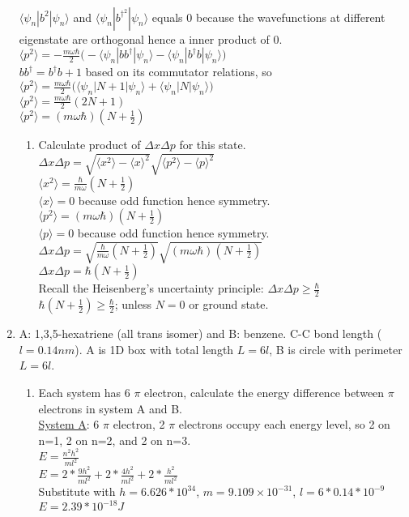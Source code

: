 \documentclass{article}
\begin{document}
\begin{enumerate}
    \\ $\langle\psi_n|b^2|\psi_n\rangle$ and $\langle\psi_n|b^\dagger^2|\psi_n\rangle$ equals 0 because the wavefunctions at different eigenstate are orthogonal hence a inner product of 0.
    \\ $\langle p^2\rangle=-\frac{m\omega\hbar}{2}\Big(-\langle\psi_n|bb^\dagger|\psi_n\rangle -\langle\psi_n|b^\dagger b|\psi_n\rangle\Big)$
    \\ $bb^\dagger = b^\dagger b +1$ based on its commutator relations, so
    \\ $\langle p^2\rangle=\frac{m\omega\hbar}{2}\Big(\langle\psi_n|N+1|\psi_n\rangle +\langle\psi_n|N|\psi_n\rangle\Big)$
    \\ $\langle p^2\rangle=\frac{m\omega\hbar}{2}(2N+1)$
    \\ $\langle p^2\rangle=(m\omega\hbar)(N+\frac{1}{2})$ 
    \begin{enumerate}
    \item Calculate product of $\Delta x\Delta p$ for this state. 
    \\ $\Delta x\Delta p=\sqrt{\langle x^2\rangle-\langle x\rangle^2} \sqrt{ \langle p^2\rangle-\langle p\rangle^2}$
    \\ $\langle x^2\rangle=\frac{\hbar}{m\omega}(N+\frac{1}{2})$
    \\ $\langle x \rangle=0$ because odd function hence symmetry.
    \\ $\langle p^2\rangle=(m\omega\hbar)(N+\frac{1}{2})$ 
    \\ $\langle p \rangle=0$ because odd function hence symmetry.
    \\ $\Delta x\Delta p= \sqrt{\frac{\hbar}{m\omega}(N+\frac{1}{2})} \sqrt{(m\omega\hbar)(N+\frac{1}{2})}$
    \\ $\Delta x\Delta p= \hbar(N+\frac{1}{2})$
    \\ Recall the Heisenberg's uncertainty principle: $\Delta x\Delta p \ge \frac{\hbar}{2}$
    \\ $\hbar(N+\frac{1}{2}) \ge \frac{\hbar}{2}$; unless $N=0$ or ground state. 
    \end{enumerate}
\item A: 1,3,5-hexatriene (all trans isomer) and B: benzene. C-C bond length ($l=0.14nm$). A is 1D box with total length $L=6l$, B is circle with perimeter $L=6l$. 
    \begin{enumerate}
    \item Each system has 6 $\pi$ electron, calculate the energy difference between $\pi$ electrons in system A and B.
    \\ \underline{System A}: 6 $\pi$ electron, 2 $\pi$ electrons occupy each energy level, so 2 on n=1, 2 on n=2, and 2 on n=3.
    \\ $E=\frac{n^2h^2}{ml^2}$
    \\ $E=2*\frac{9h^2}{ml^2}+2*\frac{4h^2}{ml^2}+2*\frac{h^2}{ml^2}$
    \\ Substitute with $h=6.626*10^{34}$, $m=9.109 × 10^{-31}$, $l=6*0.14*10^{-9}$
    \\ $E = 2.39*10^{-18}J$
    

\end{enumerate}
\end{enumerate}
\end{document}

